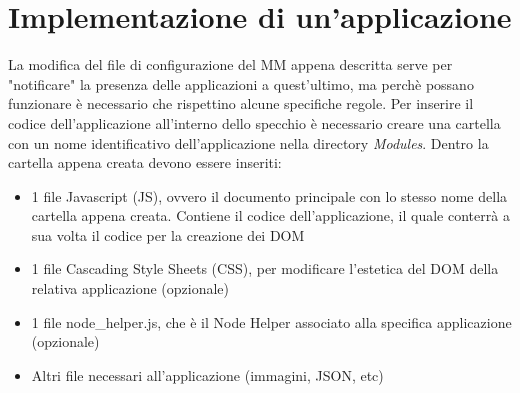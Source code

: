 \section{Implementazione di un'applicazione}\label{cap:app}
La modifica del file di configurazione del MM appena descritta serve per "notificare" la presenza delle applicazioni a quest'ultimo,
ma perch\`e possano funzionare \`e necessario che rispettino alcune specifiche regole.
Per inserire il codice dell'applicazione all'interno dello specchio \`e necessario creare una cartella con un nome identificativo dell'applicazione
nella directory \textit{Modules}.
Dentro la cartella appena creata devono essere inseriti:
\begin{itemize}
\item 1 file Javascript (JS), ovvero il documento principale con lo stesso nome della cartella appena creata. Contiene il codice dell'applicazione, il quale
conterr\`a a sua volta il codice per la creazione dei DOM
\item 1 file Cascading Style Sheets (CSS), per modificare l'estetica del DOM della relativa applicazione (opzionale)
\item 1 file node\_helper.js, che \`e il Node Helper associato alla specifica applicazione (opzionale)
\item Altri file necessari all'applicazione (immagini, JSON, etc)\\[1\baselineskip]
\end{itemize}



